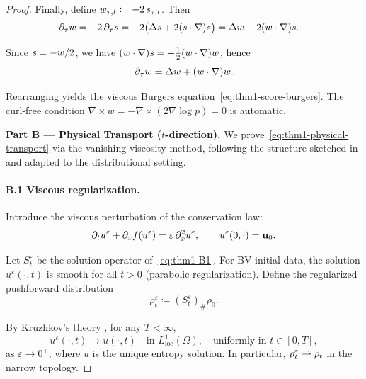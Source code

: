 \begin{proof}
Finally, define $w_{\tau, t} \coloneqq -2\, s_{\tau, t}$. Then
\begin{align}
\partial_{\tau} w
&= -2\,\partial_{\tau} s
 = -2\bigl(\Delta s + 2(s \cdot \nabla) s\bigr)
 = \Delta w - 2(w \cdot \nabla) s.
\label{eq:thm1-A6}
\end{align}

Since $s = -w/2$, we have $(w \cdot \nabla)s = -\tfrac{1}{2} (w \cdot \nabla) w$, hence
\begin{equation}
\partial_{\tau} w = \Delta w + (w \cdot \nabla) w.
\label{eq:thm1-A7}
\end{equation}

Rearranging yields the viscous Burgers equation~\eqref{eq:thm1-score-burgers}. The curl-free condition $\nabla \times w = -\nabla \times (2\nabla \log p) = 0$ is automatic.

\medskip
\noindent
\textbf{Part B --- Physical Transport ($t$-direction).}
We prove~\eqref{eq:thm1-physical-transport} via the vanishing viscosity method, following the structure sketched in \citet{kruzhkov1970} and adapted to the distributional setting.

\paragraph{B.1 Viscous regularization.}
Introduce the viscous perturbation of the conservation law:
\begin{equation}
\partial_{t} u^{\varepsilon} + \partial_{x} f(u^{\varepsilon}) = \varepsilon\, \partial_{x}^{2} u^{\varepsilon}, \qquad
u^{\varepsilon}(0, \cdot) = \mathbf{u}_{0} .
\label{eq:thm1-B1}
\end{equation}

Let $S_{t}^{\varepsilon}$ be the solution operator of~\eqref{eq:thm1-B1}. For BV initial data, the solution $u^{\varepsilon}(\cdot, t)$ is smooth for all $t > 0$ (parabolic regularization). Define the regularized pushforward distribution
\begin{equation}
\rho_{t}^{\varepsilon} \coloneqq (S_{t}^{\varepsilon})_{\#} \rho_{0}.
\label{eq:thm1-B1-dist}
\end{equation}

By Kruzhkov's theory \citep{kruzhkov1970}, for any $T < \infty$,
\begin{equation}
u^{\varepsilon}(\cdot, t) \to u(\cdot, t) \quad \text{in } L^{1}_{\mathrm{loc}}(\Omega), \quad \text{uniformly in } t \in [0,T],
\label{eq:thm1-B1-conv}
\end{equation}
as $\varepsilon \to 0^{+}$, where $u$ is the unique entropy solution. In particular, $\rho_{t}^{\varepsilon} \rightharpoonup \rho_{t}$ in the narrow topology.


\end{proof}
